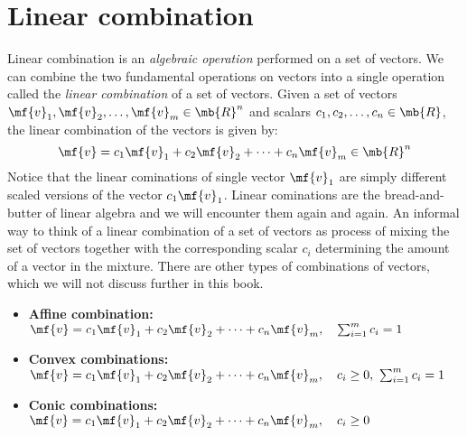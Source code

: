 \section{Linear combination}
Linear combination is an \textit{algebraic operation} performed on a set of vectors. We can combine the two fundamental operations on vectors into a single operation called the \textit{linear combination} of a set of vectors. Given a set of vectors $\mf{v}_1, \mf{v}_2, \ldots, \mf{v}_m \in \mb{R}^n$ and scalars $c_1, c_2, \ldots, c_n \in \mb{R}$, the linear combination of the vectors is given by:
\begin{equation}
    \mf{v} = c_1 \mf{v}_1 + c_2 \mf{v}_2 + \cdots + c_n \mf{v}_m \in \mb{R}^n
    \label{eq:linear-comb}
\end{equation}
Notice that the linear cominations of single vector $\mf{v}_1$ are simply different scaled versions of the vector $c_1 \mf{v}_1$. Linear cominations are the bread-and-butter of linear algebra and we will encounter them again and again. An informal way to think of a linear combination of a set of vectors as process of mixing the set of vectors together with the corresponding scalar $c_i$ determining the amount of a vector in the mixture. There are other types of combinations of vectors, which we will not discuss further in this book.
\begin{itemize}
    \item \textbf{Affine combination:} $\mf{v} = c_1 \mf{v}_1 + c_2 \mf{v}_2 + \cdots + c_n \mf{v}_m, \quad \sum_{i=1}^{m} c_i = 1$
    \item \textbf{Convex combinations:} $\mf{v} = c_1 \mf{v}_1 + c_2 \mf{v}_2 + \cdots + c_n \mf{v}_m, \quad c_i \geq 0, \,\, \sum_{i=1}^{m} c_i = 1$
    \item \textbf{Conic combinations:} $\mf{v} = c_1 \mf{v}_1 + c_2 \mf{v}_2 + \cdots + c_n \mf{v}_m, \quad c_i \geq 0$
\end{itemize}

